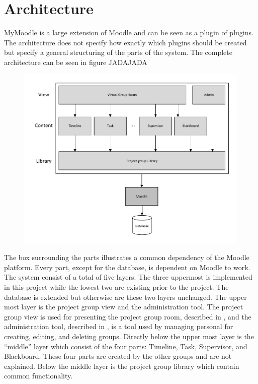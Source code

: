 \section{Architecture}
MyMoodle is a large extension of Moodle and can be seen as a plugin of plugins. 
The architecture does not specify how exactly which plugins should be created but specify a general structuring of the parts of the system. 
The complete architecture can be seen in figure JADAJADA
\begin{figure}
	\centering
		\includegraphics{images/architecture.pdf}
	\label{fig:architecture}
\end{figure}
The box surrounding the parts illustrates a common dependency of the Moodle platform. 
Every part, except for the database, is dependent on Moodle to work. 
The system consist of a total of five layers. 
The three uppermost is implemented in this project while the lowest two are existing prior to the project. 
The database is extended but otherwise are these two layers unchanged.
The upper most layer is the project group view and the administration tool.
The project group view is used for presenting the project group room, described in , and the administration tool, described in , is a tool used by managing personal for creating, editing, and deleting groups. 
Directly below the upper most layer is the ``middle'' layer which consist of the four parts: Timeline, Task, Supervisor, and Blackboard. These four parts are created by the other groups and are not explained. 
Below the middle layer is the project group library which contain common functionality.
 

